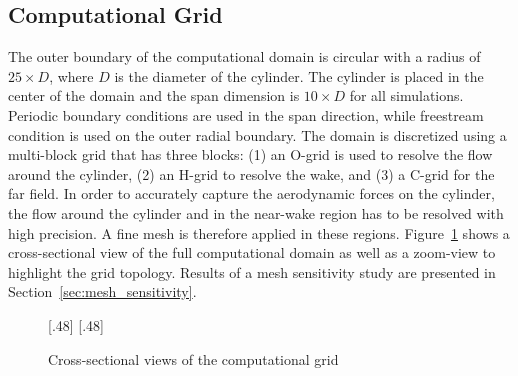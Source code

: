 \subsection{Computational Grid}
\label{sec:grids}
%
The outer boundary of the computational domain is circular with a radius of
$25\times D$, where $D$ is the diameter of the cylinder. The cylinder is placed
in the center of the domain and the span dimension is $10\times D$ for all
simulations. Periodic boundary conditions are used in the span direction, while
freestream condition is used on the outer radial boundary. The domain is
discretized using a multi-block grid that has three blocks: (1) an O-grid is
used to resolve the flow around the cylinder, (2) an H-grid to resolve the
wake, and (3) a C-grid for the far field. In order to accurately capture the
aerodynamic forces on the cylinder, the flow around the cylinder and in the
near-wake region has to be resolved with high precision. A fine mesh is
therefore applied in these regions.  Figure~\ref{fig:Mesh} shows a
cross-sectional view of the full computational domain as well as a zoom-view to
highlight the grid topology. Results of a mesh sensitivity study are presented
in Section~\ref{sec:mesh_sensitivity}.
%
\begin{figure}[htb!]
  \centering
    [.48\linewidth]{}
  \hspace*{\fill}
    [.48\linewidth]{}
  \caption{Cross-sectional views of the computational grid}
  \label{fig:Mesh}
\end{figure}

